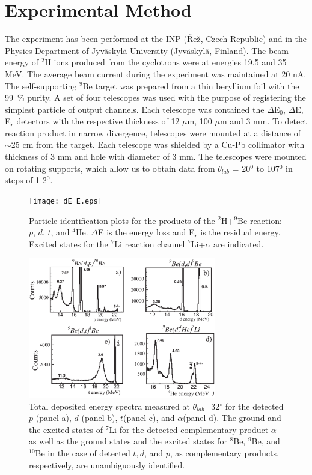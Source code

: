 \documentclass[10pt]{iopart}
\begin{document}
\section{Experimental Method}
The experiment has been performed at  the INP (\v{R}e\v{z}, Czech Republic) and  in the Physics Department of Jyv\"{a}skyl\"{a} University (Jyv\"askyl\"a, Finland).  The beam energy of $^2$H ions produced from the cyclotrons were at energies 19.5 and 35 MeV. The average beam current during the experiment was maintained at 20 nA. The self-supporting $^9$Be target was prepared from a thin beryllium foil with the 99~\% purity. A set of four telescopes was used with the purpose of registering the simplest particle of output channels. Each telescope was  contained the $\Delta$E$_0$, $\Delta$E, E$_r$ detectors with the respective thickness of 12 $\mu$m, 100 $\mu$m and 3 mm.
To detect reaction product in narrow divergence,  telescopes were mounted at a distance of $\sim$25 cm from the target. Each telescope was shielded by a Cu-Pb collimator with thickness of 3 mm and hole with diameter of 3 mm. 
The telescopes were mounted on rotating supports, which allow us to obtain data from $\theta_{lab}$ = 20$^{0}$ to 107$^{0}$ in steps of 1-2$^{0}$.

\begin{figure}[tp]
\centering
\texttt{[image: dE\_E.eps]}
\caption{Particle identification plots for the products of the $^{2}$H+$^9$Be reaction: $p$, $d$, $t$, and $^{4}$He. $\Delta$E is the energy loss and E$_r$ is the residual energy. Excited states for the $^7$Li reaction channel $^7$Li+$\alpha$ are indicated.}
\label{fig1}
\end{figure}

\begin{figure}[tp]
 \includegraphics[width=8.2cm]{d_Etot_Fig2.eps}
\caption{Total deposited energy spectra measured at $\theta_{lab}$=32$^\circ$ for the detected $p$ (panel a), $d$ (panel b), $t$(panel c), and $\alpha$(panel d). The ground and the excited states of $^7$Li for the detected complementary product $\alpha$ as well as the ground states and the excited states for $^8$Be, $^9$Be, and $^{10}$Be in the case of detected $t, d$, and $p$, as complementary products, respectively, are unambiguously identified.}
\label{fig2}
\end{figure}	
\end{document}
